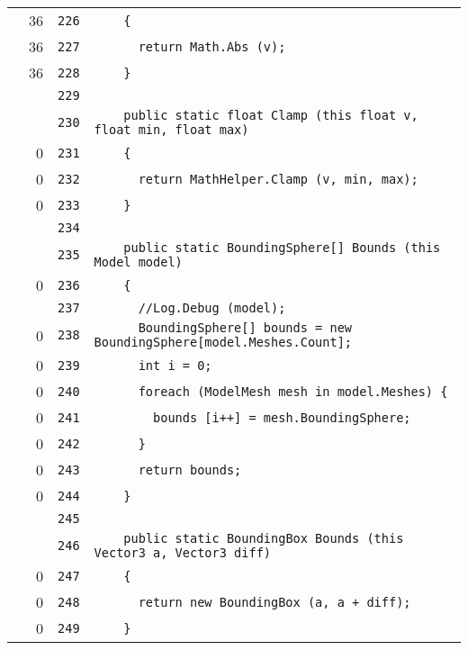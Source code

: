 \documentclass[a4paper,10pt]{article}
\begin{document}
\begin{longtable}[l]{lrrl}
\cellcolor{green} & 36 & \verb~226~ & \verb~    {~\\
\cellcolor{green} & 36 & \verb~227~ & \verb~      return Math.Abs (v);~\\
\cellcolor{green} & 36 & \verb~228~ & \verb~    }~\\
\cellcolor{gray} &  & \verb~229~ & \verb~~\\
\cellcolor{gray} &  & \verb~230~ & \verb~    public static float Clamp (this float v, float min, float max)~\\
\cellcolor{red} & 0 & \verb~231~ & \verb~    {~\\
\cellcolor{red} & 0 & \verb~232~ & \verb~      return MathHelper.Clamp (v, min, max);~\\
\cellcolor{red} & 0 & \verb~233~ & \verb~    }~\\
\cellcolor{gray} &  & \verb~234~ & \verb~~\\
\cellcolor{gray} &  & \verb~235~ & \verb~    public static BoundingSphere[] Bounds (this Model model)~\\
\cellcolor{red} & 0 & \verb~236~ & \verb~    {~\\
\cellcolor{gray} &  & \verb~237~ & \verb~      //Log.Debug (model);~\\
\cellcolor{red} & 0 & \verb~238~ & \verb~      BoundingSphere[] bounds = new BoundingSphere[model.Meshes.Count];~\\
\cellcolor{red} & 0 & \verb~239~ & \verb~      int i = 0;~\\
\cellcolor{red} & 0 & \verb~240~ & \verb~      foreach (ModelMesh mesh in model.Meshes) {~\\
\cellcolor{red} & 0 & \verb~241~ & \verb~        bounds [i++] = mesh.BoundingSphere;~\\
\cellcolor{red} & 0 & \verb~242~ & \verb~      }~\\
\cellcolor{red} & 0 & \verb~243~ & \verb~      return bounds;~\\
\cellcolor{red} & 0 & \verb~244~ & \verb~    }~\\
\cellcolor{gray} &  & \verb~245~ & \verb~~\\
\cellcolor{gray} &  & \verb~246~ & \verb~    public static BoundingBox Bounds (this Vector3 a, Vector3 diff)~\\
\cellcolor{red} & 0 & \verb~247~ & \verb~    {~\\
\cellcolor{red} & 0 & \verb~248~ & \verb~      return new BoundingBox (a, a + diff);~\\
\cellcolor{red} & 0 & \verb~249~ & \verb~    }~\\

\end{longtable}
\end{document}

